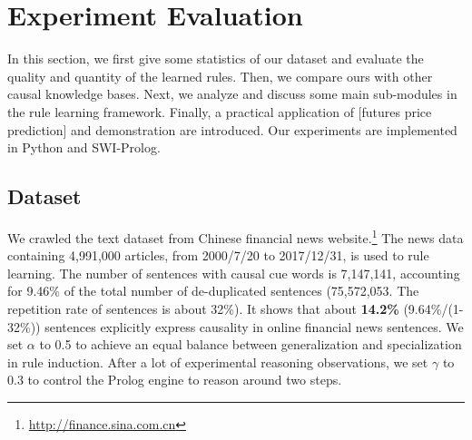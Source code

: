 \section{Experiment Evaluation}
\label{sec:experiment}
In this section, we first give some statistics of our dataset and evaluate the quality and quantity of the learned rules. Then, we compare ours with other causal knowledge bases. Next, we analyze and discuss some main sub-modules in the rule learning framework. Finally, a practical application of [futures price prediction] and demonstration are introduced. Our experiments are implemented in Python and SWI-Prolog.
	
\subsection{Dataset}
We crawled the text dataset from Chinese financial news website.\footnote{\url{ http://finance.sina.com.cn}} The news data containing 4,991,000 articles, from 2000/7/20 to 2017/12/31, is used to rule learning.
The number of sentences with causal cue words is 7,147,141, accounting for 9.46\% of the total number of de-duplicated sentences (75,572,053. The repetition rate of sentences is about 32\%).
It shows that about  \textbf{14.2\%} (9.64\%/(1-32\%)) sentences explicitly express causality in online financial news sentences.
We set $\alpha$ to 0.5 to achieve an equal balance between generalization and specialization in rule induction. 
After a lot of experimental reasoning observations, we set $\gamma$ to 0.3 to control the Prolog engine to reason around two steps.


